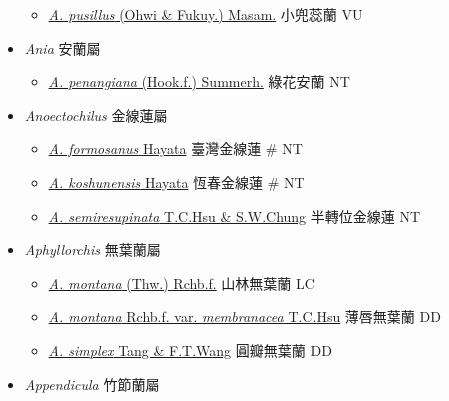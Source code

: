 \begin{itemize}
  \begin{itemize}
        \item[] \href{http://www.theplantlist.org/tpl1.1/search?q=Androcorys+pusillus}{\textit{A. pusillus} (Ohwi \& Fukuy.) Masam.}   小兜蕊蘭   VU
  \end{itemize}
 \item[] \textit{Ania} 安蘭屬
                                
  \begin{itemize}
        \item[] \href{http://www.theplantlist.org/tpl1.1/search?q=Ania+penangiana}{\textit{A. penangiana} (Hook.f.) Summerh.}   綠花安蘭   NT
  \end{itemize}
 \item[] \textit{Anoectochilus} 金線蓮屬
                                
  \begin{itemize}
        \item[] \href{http://www.theplantlist.org/tpl1.1/search?q=Anoectochilus+formosanus}{\textit{A. formosanus} Hayata}   臺灣金線蓮  \# NT
        \item[] \href{http://www.theplantlist.org/tpl1.1/search?q=Anoectochilus+koshunensis}{\textit{A. koshunensis} Hayata}   恆春金線蓮  \# NT
        \item[] \href{http://www.theplantlist.org/tpl1.1/search?q=Anoectochilus+semiresupinata}{\textit{A. semiresupinata} T.C.Hsu \& S.W.Chung}   半轉位金線蓮   NT
  \end{itemize}
 \item[] \textit{Aphyllorchis} 無葉蘭屬
                                
  \begin{itemize}
        \item[] \href{http://www.theplantlist.org/tpl1.1/search?q=Aphyllorchis+montana}{\textit{A. montana} (Thw.) Rchb.f.}   山林無葉蘭   LC
        \item[] \href{http://www.theplantlist.org/tpl1.1/search?q=Aphyllorchis+montana+var.+membranacea}{\textit{A. montana} Rchb.f. var. \textit{membranacea} T.C.Hsu}   薄唇無葉蘭   DD
        \item[] \href{http://www.theplantlist.org/tpl1.1/search?q=Aphyllorchis+simplex}{\textit{A. simplex} Tang \& F.T.Wang}   圓瓣無葉蘭   DD
  \end{itemize}
 \item[] \textit{Appendicula} 竹節蘭屬
                                

\end{itemize}

